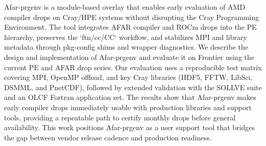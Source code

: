 Afar-prgenv is a module-based overlay that enables early evaluation of AMD
compiler drops on Cray/HPE systems without disrupting the Cray Programming
Environment. The tool integrates AFAR compiler and ROCm drops into the PE
hierarchy, preserves the `ftn/cc/CC` workflow, and stabilizes MPI and library
metadata through pkg-config shims and wrapper diagnostics. We describe the
design and implementation of Afar-prgenv and evaluate it on Frontier using the
current PE and AFAR drop series. Our evaluation uses a reproducible test
matrix covering MPI, OpenMP offload, and key Cray libraries (HDF5, FFTW,
LibSci, DSMML, and PnetCDF), followed by extended validation with the SOLLVE
suite and an OLCF Fortran application set. The results show that Afar-prgenv
makes early compiler drops immediately usable with production libraries and
support tools, providing a repeatable path to certify monthly drops before
general availability. This work positions Afar-prgenv as a user support tool
that bridges the gap between vendor release cadence and production readiness.
